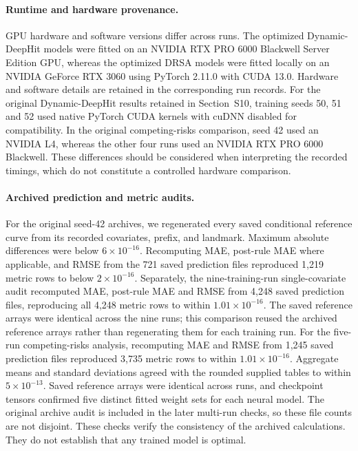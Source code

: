 \paragraph{Runtime and hardware provenance.}\label{app:runtime}
GPU hardware and software versions differ across runs. The optimized Dynamic-DeepHit models were fitted on an NVIDIA RTX PRO 6000 Blackwell Server Edition GPU, whereas the optimized DRSA models were fitted locally on an NVIDIA GeForce RTX 3060 using PyTorch 2.11.0 with CUDA 13.0. Hardware and software details are retained in the corresponding run records. For the original Dynamic-DeepHit results retained in Section~S10, training seeds 50, 51 and 52 used native PyTorch CUDA kernels with cuDNN disabled for compatibility. In the original competing-risks comparison, seed 42 used an NVIDIA L4, whereas the other four runs used an NVIDIA RTX PRO 6000 Blackwell. These differences should be considered when interpreting the recorded timings, which do not constitute a controlled hardware comparison.

\paragraph{Archived prediction and metric audits.}
For the original seed-42 archives, we regenerated every saved conditional reference curve from its recorded covariates, prefix, and landmark. Maximum absolute differences were below $6\times10^{-16}$. Recomputing MAE, post-rule MAE where applicable, and RMSE from the 721 saved prediction files reproduced 1,219 metric rows to below $2\times10^{-16}$. Separately, the nine-training-run single-covariate audit recomputed MAE, post-rule MAE and RMSE from 4,248 saved prediction files, reproducing all 4,248 metric rows to within $1.01\times10^{-16}$. The saved reference arrays were identical across the nine runs; this comparison reused the archived reference arrays rather than regenerating them for each training run. For the five-run competing-risks analysis, recomputing MAE and RMSE from 1,245 saved prediction files reproduced 3,735 metric rows to within $1.01\times10^{-16}$. Aggregate means and standard deviations agreed with the rounded supplied tables to within $5\times10^{-13}$. Saved reference arrays were identical across runs, and checkpoint tensors confirmed five distinct fitted weight sets for each neural model. The original archive audit is included in the later multi-run checks, so these file counts are not disjoint. These checks verify the consistency of the archived calculations. They do not establish that any trained model is optimal.
